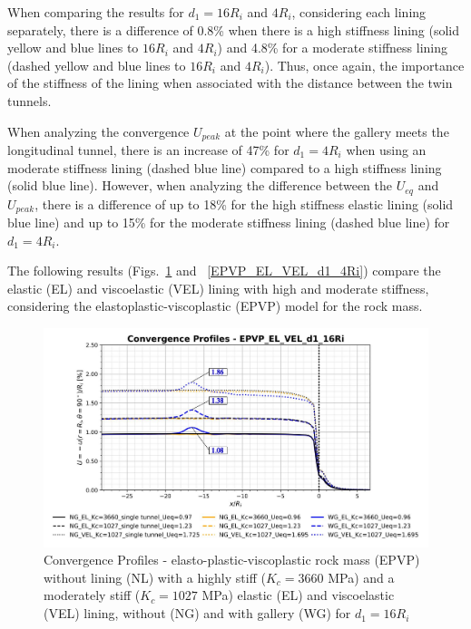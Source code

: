 \documentclass[a4paper,fleqn]{cas-sc}
\begin{document}
When comparing the results for $d_1 = 16R_i$ and $4R_i$, considering each lining separately, there is a difference of 0.8\% when there is a high stiffness lining (solid yellow and blue lines to $16R_i$ and $4R_i$) and 4.8\% for a moderate stiffness lining (dashed yellow and blue lines to $16R_i$ and $4R_i$). Thus, once again, the importance of the stiffness of the lining when associated with the distance between the twin tunnels.

When analyzing the convergence $U_{peak}$ at the point where the gallery meets the longitudinal tunnel, there is an increase of 47\% for $d_1=4R_i$ when using an moderate stiffness lining (dashed blue line) compared to a high stiffness lining (solid blue line). However, when analyzing the difference between the $U_{eq}$ and $U_{peak}$, there is a difference of up to 18\% for the high stiffness elastic lining (solid blue line) and up to 15\% for the moderate stiffness lining (dashed blue line) for $d_1=4R_i$.

The following results (Figs.~\ref{EPVP_EL_VEL_d1_16Ri} and ~\ref{EPVP_EL_VEL_d1_4Ri}) compare the elastic (EL) and viscoelastic (VEL) lining with high and moderate stiffness, considering the elastoplastic-viscoplastic (EPVP) model for the rock mass. 

\begin{figure}[h!]
	\centering
	\includegraphics[scale=0.5]{Convergence Profiles - EPVP_EL_VEL_d1_16Ri.pdf}
	\caption{Convergence Profiles - elasto-plastic-viscoplastic rock mass (EPVP) without lining (NL) with a highly stiff ($K_c = 3660$ MPa) and a moderately stiff ($K_c = 1027$ MPa) elastic (EL) and viscoelastic (VEL) lining, without (NG) and with gallery (WG) for $d_1 = 16R_i$}
	\label{EPVP_EL_VEL_d1_16Ri}
\end{figure}
\FloatBarrier
\end{document}
